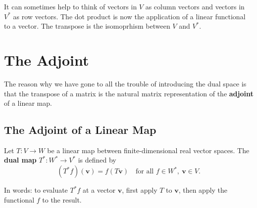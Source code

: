 It can sometimes help to think of vectors in $V$ as column vectors and vectors in $V^*$ as row vectors. The dot product is now the application of a linear functional to a vector. The transpose is the isomoprhism between $V$ and $V^*$. 



















\section*{\huge The Adjoint}

The reason why we have gone to all the trouble of introducing the dual space is that the transpose of a matrix is the natural matrix representation of the \textbf{adjoint} of a linear map. 

\subsection*{\Large The Adjoint of a Linear Map}

Let $ T: V \to W $ be a linear map between finite-dimensional real vector spaces.  
The \textbf{dual map} $ T^*: W^* \to V^* $ is defined by
\[
(T^* f)(\mathbf{v}) = f(T\mathbf{v}) \quad \text{for all } f \in W^*,\ \mathbf{v} \in V.
\]

In words: to evaluate $ T^* f $ at a vector $ \mathbf{v} $, first apply $ T $ to $ \mathbf{v} $, then apply the functional $ f $ to the result.  

